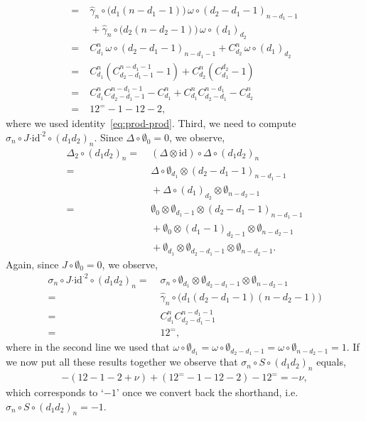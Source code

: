 \documentclass[5p,twocolumn]{elsarticle}
\newcommand*{\id}{{\mathrm{id}}}
\newcommand*{\cendot}{\boldsymbol{\cdot}}
\begin{document}
\begin{example}
\begin{align*}
    =&\;\hat{\gamma}_n\circ\bigl(d_1(n-d_1-1)\bigr)\,\omega\circ(d_2-d_1-1)_{n-d_1-1}\\
    &\;+\hat{\gamma}_n\circ\bigl(d_2(n-d_2-1)\bigr)\,\omega\circ(d_1)_{d_2}\\
    =&\;C_{d_1}^n\,\omega\circ(d_2-d_1-1)_{n-d_1-1}+C_{d_2}^n\,\omega\circ(d_1)_{d_2}\\
    =&\;C_{d_1}^n(C_{d_2-d_1-1}^{n-d_1-1}-1)+C_{d_2}^n(C_{d_1}^{d_2}-1)\\
    =&\;C_{d_1}^nC_{d_2-d_1-1}^{n-d_1-1}-C_{d_1}^n+C_{d_1}^nC_{d_2-d_1}^{n-d_1}-C_{d_2}^n\\
    =&\;12^=-1-12-2,
  \end{align*}
  where we used identity~\eqref{eq:prod-prod}. Third, we need to compute $\sigma_n\circ J\cendot\id^{\cendot2}\circ (d_1d_2)_n$.
  Since $\Delta\circ\emptyset_0=0$, we observe,
  \begin{align*}
    \Delta_2\circ (d_1d_2)_n=&\;(\Delta\otimes\id)\circ\Delta\circ (d_1d_2)_n\\
                           =&\;\Delta\circ\emptyset_{d_1}\otimes(d_2-d_1-1)_{n-d_1-1}\\
                            &\;+\Delta\circ(d_1)_{d_2}\otimes\emptyset_{n-d_2-1}\\
                           =&\;\emptyset_0\otimes\emptyset_{d_1-1}\otimes(d_2-d_1-1)_{n-d_1-1}\\
                            &\;+\emptyset_0\otimes(d_1-1)_{d_2-1}\otimes\emptyset_{n-d_2-1}\\
                            &\;+\emptyset_{d_1}\otimes\emptyset_{d_2-d_1-1}\otimes\emptyset_{n-d_2-1}.
  \end{align*}
  Again, since $J\circ\emptyset_0=0$, we observe,
  \begin{align*}
    \sigma_n\circ J\cendot\id^{\cendot2}\circ (d_1d_2)_n=&\;\sigma_n\circ\emptyset_{d_1}\otimes\emptyset_{d_2-d_1-1}\otimes\emptyset_{n-d_2-1}\\
                                                      =&\;\hat{\gamma}_n\circ\bigl(d_1(d_2\!-\!d_1\!-\!1)(n\!-\!d_2\!-\!1)\bigr)\\
                                                      =&\;C_{d_1}^nC_{d_2-d_1-1}^{n-d_1-1}\\
                                                      =&\;12^=,
  \end{align*}
  where in the second line we used that $\omega\circ\emptyset_{d_1}=\omega\circ\emptyset_{d_2-d_1-1}=\omega\circ\emptyset_{n-d_2-1}=1$.
  If we now put all these results together we observe that $\sigma_n\circ S\circ (d_1d_2)_n$ equals,
  \begin{align*}
    -(12-1-2+\nu)+(12^=-1-12-2)-12^==-\nu,
  \end{align*}
  which corresponds to `$-1$' once we convert back the shorthand, i.e. \/ $\sigma_n\circ S\circ (d_1d_2)_n=-1$.
\end{example}
\end{document}
